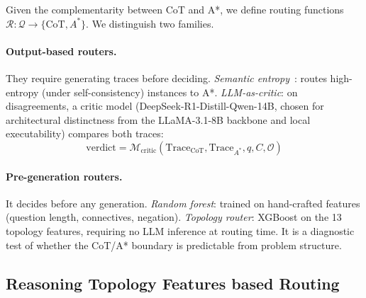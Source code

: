 \documentclass{article}
\begin{document}
Given the complementarity between CoT and A*, we define routing functions $\mathcal{R}: \mathcal{Q} \to \{\text{CoT}, A^*\}$. We distinguish two families.

\paragraph{Output-based routers.} They require generating traces before deciding. \emph{Semantic entropy}~\citep{kossen2024semanticentropyprobesrobust}: routes high-entropy (under self-consistency) instances to A*. \emph{LLM-as-critic}: on disagreements, a critic model (DeepSeek-R1-Distill-Qwen-14B, chosen for architectural distinctness from the LLaMA-3.1-8B backbone and local executability) compares both traces:
\begin{equation}
\text{verdict} = \mathcal{M}_{\text{critic}}(\text{Trace}_{\text{CoT}}, \text{Trace}_{A^*}, q, C, \mathcal{O})
\label{eq:critic}
\end{equation}

\paragraph{Pre-generation routers.} It decides before any generation. \emph{Random forest}: trained on hand-crafted features (question length, connectives, negation). \emph{Topology router}: XGBoost on the 13 topology features, requiring no LLM inference at routing time. It is a diagnostic test of whether the CoT/A* boundary is predictable from problem structure.


\subsection{Reasoning Topology Features based Routing}
\label{sec:topology_features}

\end{document}
